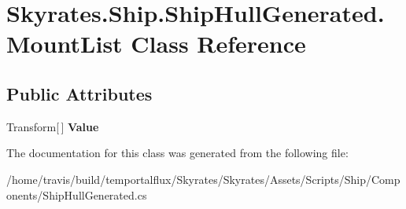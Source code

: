 \hypertarget{class_skyrates_1_1_ship_1_1_ship_hull_generated_1_1_mount_list}{\section{Skyrates.\-Ship.\-Ship\-Hull\-Generated.\-Mount\-List Class Reference}
\label{class_skyrates_1_1_ship_1_1_ship_hull_generated_1_1_mount_list}
}
\subsection*{Public Attributes}
\begin{DoxyCompactItemize}
\item 
\hypertarget{class_skyrates_1_1_ship_1_1_ship_hull_generated_1_1_mount_list_a2e1782d7fdb42bc9db685020ffc67a8f}{Transform\mbox{[}$\,$\mbox{]} {\bfseries Value}}\label{class_skyrates_1_1_ship_1_1_ship_hull_generated_1_1_mount_list_a2e1782d7fdb42bc9db685020ffc67a8f}

\end{DoxyCompactItemize}


The documentation for this class was generated from the following file\-:\begin{DoxyCompactItemize}
\item 
/home/travis/build/temportalflux/\-Skyrates/\-Skyrates/\-Assets/\-Scripts/\-Ship/\-Components/Ship\-Hull\-Generated.\-cs\end{DoxyCompactItemize}

